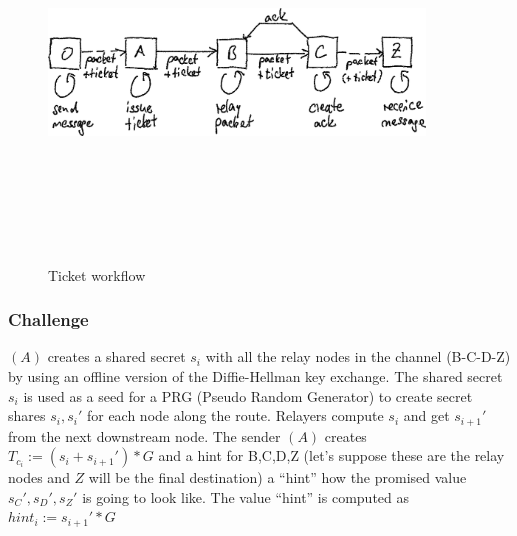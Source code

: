  \begin{figure}[H]
    \centering
    \includegraphics[width=10cm,height=10cm,keepaspectratio]{../whitepaper/images/ticket_workflow.png}
    \caption{Ticket workflow}
    \label{fig:Ticket worklow}
\end{figure}

\subsubsection{Challenge}
$(A)$ creates a shared secret $s_i$ with all the relay nodes in the channel (B-C-D-Z) by using an offline version of the Diffie-Hellman key exchange.
\newline The shared secret $s_i$ is used as a seed for a PRG (Pseudo Random Generator) to create secret shares $s_i,s_i'$ for each node along the route. 
Relayers compute $s_i$ and get $s_{i+1}'$ from the next downstream node. 
\newline The sender $(A)$ creates $T_{c_i}:=(s_i+s_{i+1}')*G$ and a hint for B,C,D,Z (let’s suppose these are the relay nodes and $Z$ will be the final destination) a “hint” how the promised value $s_C',s_D',s_Z'$ is going to look like. 
The value “hint” is computed as $hint_i:=s_{i+1}'*G$ 


